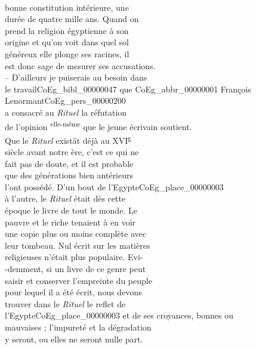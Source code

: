 \documentclass{book}
\begin{document}
{\begin{paracol}{2}
\noindent \\
\switchcolumn
\noindent bonne constitution intérieure, une\\
durée de quatre mille ans. Quand on\\
prend la religion égyptienne à son\\
origine et qu’on voit dans quel sol\\
généreux elle plonge ses racines, il\\
est donc sage de mesurer ses accusations.\\
– D’ailleurs je puiserais au besoin dans\\
le travail\gls{CoEg_bibl_00000047} que \gls{CoEg_abbr_00000001} François Lenormant\gls{CoEg_pers_00000200}\\
a consacré au \textit{Rituel} la réfutation\\
de l’opinion \textsuperscript{elle-même} que le jeune écrivain soutient.\\
Que le \textit{Rituel} existât déjà au XVI\textsuperscript{\underline{e}}\\
siècle avant notre ère, c’est ce qui ne\\
fait pas de doute, et il est probable\\
que des générations bien antérieurs\\
l’ont possédé. D’un bout de l’Egypte\gls{CoEg_place_00000003}\\
à l’autre, le \textit{Rituel} était dès cette\\
époque le livre de tout le monde. Le\\
pauvre et le riche tenaient à en voir\\
une copie plus ou moins complète avec\\
leur tombeau. Nul écrit sur les matières\\
religieuses n’était plus populaire. Evi-\\
-demment, si un livre de ce genre peut\\
saisir et conserver l’empreinte du peuple\\
pour lequel il a été écrit, nous devons\\
trouver dans le \textit{Rituel} le reflet de\\
l’Egypte\gls{CoEg_place_00000003} et de ses croyances, bonnes ou\\
mauvaises ; l’impureté et la dégradation\\
y seront, ou elles ne seront nulle part.\\

\end{paracol}}
\end{document}
